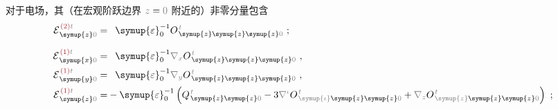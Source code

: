 对于电场，其（在宏观阶跃边界 $\mathcolor{gray}{z \mathcolor{black}{=} 0}$ 附近的）非零分量包含
\begin{subequations} \label{eq:E^(2-0)_0==}
\begin{align}
	{\mathcal{E}}^{\;\!\textcolor{Maroon}{(2)}\mathcolor{gray}{t}}_{\;\! \symup{z} \mathcolor{gray}{0}} = &\hphantom{+} {\symup{\varepsilon}}_0^{-1} O^{\;\!\mathcolor{gray}{t}}_{\;\! \symup{z}\symup{z}\symup{z}\mathcolor{gray}{0}}~; \label{eq:E^(2)_z0==} \\[0.7em]
	{\mathcal{E}}^{\;\!\textcolor{Maroon}{(1)}\mathcolor{gray}{t}}_{\;\! \symup{x} \mathcolor{gray}{0}} = &\hphantom{+} {\symup{\varepsilon}}_0^{-1} \mathcolor{gray}{\nabla_x} O^{\;\!\mathcolor{gray}{t}}_{\;\! \symup{z}\symup{z}\symup{z}\mathcolor{gray}{0}}~, \label{eq:E^(1)_x0==} \\
	{\mathcal{E}}^{\;\!\textcolor{Maroon}{(1)}\mathcolor{gray}{t}}_{\;\! \symup{y} \mathcolor{gray}{0}} = &\hphantom{+} {\symup{\varepsilon}}_0^{-1} \mathcolor{gray}{\nabla_y} O^{\;\!\mathcolor{gray}{t}}_{\;\! \symup{z}\symup{z}\symup{z}\mathcolor{gray}{0}}~, \label{eq:E^(1)_y0==} \\
	{\mathcal{E}}^{\;\!\textcolor{Maroon}{(1)}\mathcolor{gray}{t}}_{\;\! \symup{z} \mathcolor{gray}{0}} = &- {\symup{\varepsilon}}_0^{-1} \left( Q^{\;\!\mathcolor{gray}{t}}_{\;\! \symup{z} \symup{z} \mathcolor{gray}{0}} - 3 \mathcolor{gray}{\nabla^\iota} O^{\;\!\mathcolor{gray}{t}}_{\;\! \mathcolor{gray}{\symup{\iota}} \symup{z} \symup{z} \mathcolor{gray}{0}} + \mathcolor{gray}{\nabla_z} O^{\;\!\mathcolor{gray}{t}}_{\;\! \mathcolor{gray}{\symup{z}} \symup{z} \symup{z} \mathcolor{gray}{0}} \right)~; \label{eq:E^(1)_z0==} \\[0.7em]

\end{align}
\end{subequations}
